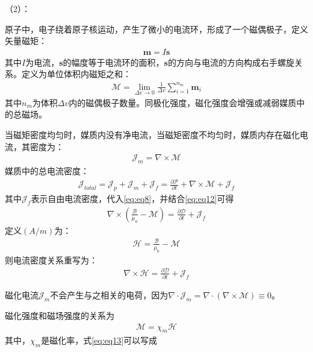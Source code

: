 \documentclass{article}
\numberwithin{equation}{section}
\renewcommand{\vec}[1]{\boldsymbol{#1}}
\begin{document}
（2）\textbf{\color{blue}{磁化}}：\par
原子中，电子绕着原子核运动，产生了微小的电流环，形成了一个磁偶极子，定义矢量磁矩：
\begin{align}
    \vec{m}=I\vec{s}
\end{align}
其中$I$为电流，$\vec{s}$的幅度等于电流环的面积，$\vec{s}$的方向与电流的方向构成右手螺旋关系。定义\textbf{\color{blue}{磁化强度}}为单位体积内磁矩之和：
\begin{align}
    \vec{\mathcal{M}}=\lim_{\Delta v \to 0}\frac{1}{\Delta v}\sum_{i=1}^{n_m}\vec{m}_i
\end{align}
其中$n_m$为体积$\Delta v$内的磁偶极子数量。同极化强度，磁化强度会增强或减弱媒质中的总磁场。
\par
当磁矩密度均匀时，媒质内没有净电流，当磁矩密度不均匀时，媒质内存在磁化电流，其密度为：
\begin{align}
    \vec{\mathcal{J}}_m=\nabla \times \vec{\mathcal{M}}
\end{align}
媒质中的总电流密度：
\begin{align}
    \vec{\mathcal{J}} _{total}=\vec{\mathcal{J}} _p+\vec{\mathcal{J}} _m+\vec{\mathcal{J}} _f=\frac{\partial \vec{\mathcal{P}}}{\partial t}+\nabla \times \vec{\mathcal{M}}+\vec{\mathcal{J}} _f
\end{align}
其中$\vec{\mathcal{J}} _f$表示自由电流密度，代入\ref{eq:eq8}，并结合\ref{eq:eq12}可得
\begin{align}
    \nabla \times \left(\frac{\vec{\mathcal{B}}}{\mu_0}-\vec{\mathcal{M}}\right)=\frac{\partial \vec{\mathcal{D}}}{\partial t}+\vec{\mathcal{J}} _f
\end{align}
定义\textbf{\color{blue}{磁场强度}}$(A/m)$为：
\begin{align}
    \label{eq:eq13}
    \vec{\mathcal{H}}=\frac{\vec{\mathcal{B}}}{\mu_0}-\vec{\mathcal{M}}
\end{align}
则电流密度关系重写为：
\begin{align}
    \nabla \times \vec{\mathcal{H}}=\frac{\partial \vec{\mathcal{D}}}{\partial t}+\vec{\mathcal{J}} _f
\end{align}
\par
磁化电流$\vec{\mathcal{J}}_m$不会产生与之相关的电荷，因为$\nabla \cdot \vec{\mathcal{J}}_m=\nabla \cdot (\nabla \times \vec{\mathcal{M}})\equiv 0$。
\par
磁化强度和磁场强度的关系为
\begin{align}
    \vec{\mathcal{M}}=\chi_m \vec{\mathcal{H}}
\end{align}
其中，$\chi_m$是磁化率，式\ref{eq:eq13}可以写成
\end{document}
